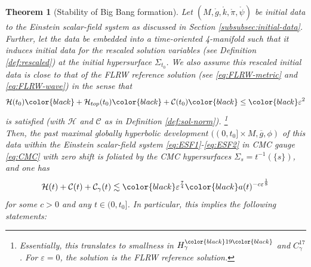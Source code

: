 \documentclass[11pt,leqno,textwidth=10cm]{amsart}
\numberwithin{equation}{section}
\theoremstyle{definition}
\theoremstyle{plain}
\newtheorem{theorem}[definition]{Theorem}
\newcommand{\1}{\mathbbm{1}}
\newcommand{\g}{\overline{g}}
\renewcommand{\epsilon}{\varepsilon}
\newcommand{\change}[1]{\color{black}#1\color{black}}
\newcommand{\delete}[1]{}
\begin{document}
\begin{theorem}[Stability of Big Bang formation]\label{thm:main}
Let $(M,\mathring{g},\mathring{k},\mathring{\pi},\mathring{\psi})$ be initial data to the Einstein scalar-field system as discussed in Section \ref{subsubsec:initial-data}. Further, let the data be embedded into a time-oriented 4-manifold such that it induces initial data for the rescaled solution variables (see Definition \ref{def:rescaled}) at the initial hypersurface $\Sigma_{t_0}$. We also assume this rescaled initial data is close to that of the FLRW reference solution (see \eqref{eq:FLRW-metric} and \eqref{eq:FLRW-wave}) in the sense that
\begin{equation}\label{eq:ass-init-main-thm}
\mathcal{H}(t_0)\change{+\mathcal{H}_{top}(t_0)}+\mathcal{C}(t_0)\change{\leq}\epsilon^2
\end{equation}
is satisfied (with $\mathcal{H}$ and $\mathcal{C}$ as in Definition \ref{def:sol-norm}).  \delete{along with [...] }%
\footnote{Essentially, this translates to smallness in $H_\gamma^{\change{19}}$ and $C_\gamma^{17}$ \delete{and [...]}. %
For $\epsilon=0$, the solution is the FLRW reference solution.}\\

Then, the past maximal globally hyperbolic development $((0,t_0]\times M,\g,\phi)$ of this data within the Einstein scalar-field system \eqref{eq:ESF1}-\eqref{eq:ESF2} in CMC gauge \eqref{eq:CMC} with zero shift is foliated by the CMC hypersurfaces $\Sigma_s=t^{-1}(\{s\})$, and one has
\begin{equation}\label{eq:bs-imp-main-thm}
\mathcal{H}(t)+\mathcal{C}(t)+\mathcal{C}_{\gamma}(t)\lesssim \change{\epsilon^\frac74} a(t)^{-c\epsilon^\frac18}
\end{equation}
for some $c>0$ and any $t\in(0,t_0]$. In particular, this implies the following statements:\\[1em]


\end{theorem}
\end{document}

